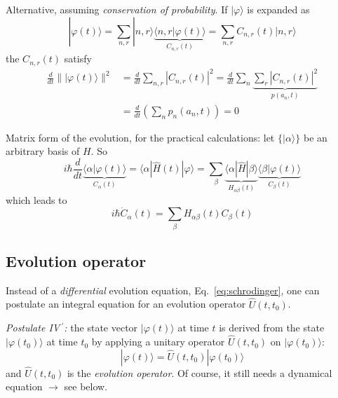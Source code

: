 \documentclass[12pt]{article}
\begin{document}
Alternative, assuming \emph{conservation of probability}.
If $|\varphi\rangle$ is expanded as
\begin{equation}
|\varphi(t)\rangle=\sum_{n, r}|n, r\rangle
\underbrace{\langle n, r| \varphi(t)\rangle}_{C_{n, r}(t)}
=\sum_{n, r} C_{n, r}(t)|n, r\rangle
\end{equation}
the $C_{n, r}(t)$ satisfy
\begin{equation}
\begin{aligned} \frac{d}{d t}\| |\varphi(t)\rangle \|^{2} &=\frac{d}{d t} \sum_{n, r}\left|C_{n, r}(t)\right|^{2}=\frac{d}{d t} \sum_{n} 
\underbrace{\sum_r \left|C_{n, r}(t)\right|^{2}}_{p\left(a_{n}, t\right)} \\ 
&=\frac{d}{d t}\left(\sum_{n} p_{n}\left(a_{n}, t\right)\right)=0 
\end{aligned}
\end{equation}

Matrix form of the evolution, for the practical calculations: 
let $\{|\alpha\rangle\}$ be an arbitrary basis of $H$. So
\[
i\hbar \frac{d}{d t} \underbrace{\langle\alpha | \varphi(t)\rangle}_{C_{\alpha}(t)}=
\langle\alpha|\hat{H}(t)| \varphi\rangle=
\sum_\beta
\underbrace{\langle\alpha|\hat{H}|\beta\rangle}_{H_{\alpha \beta}(t)}
\underbrace{\langle\beta|\varphi(t)\rangle}_{C_\beta(t)}
\]
which leads to
\begin{equation}
\boxed{i \hbar \dot{C}_{\alpha}(t)=\sum_{\beta} H_{\alpha \beta}(t) C_{\beta}(t)}
\end{equation}


\subsection{Evolution operator}

Instead of a \emph{differential} evolution equation,
Eq.~\eqref{eq:schrodinger}, one can postulate an integral equation
for an evolution operator $\hat{U}(t,t_0)$.

\emph{Postulate IV$\,^\prime$:} the state vector $|\varphi(t)\rangle$ at time $t$
is derived from the state $|\varphi(t_0)\rangle$ at
time $t_0$ by applying a unitary operator $\hat{U}(t, t_0)$ on $|\varphi(t_0)\rangle$:
\begin{equation}
\boxed{
|\varphi(t)\rangle = \hat{U}(t, t_0)|\varphi(t_0)\rangle
}
\label{eq:postulate4prime}
\end{equation} 
and $\hat{U}(t, t_0)$ is the \emph{evolution operator}. 
Of course, it still needs a dynamical equation $\to$ see below.
\end{document}
